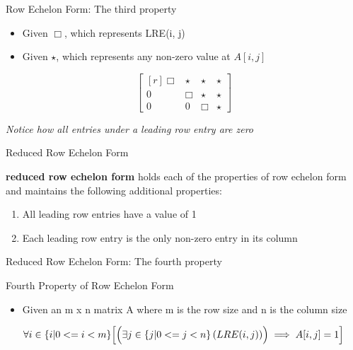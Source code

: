 \documentclass{beamer}
\begin{document}
\begin{frame}{Row Echelon Form: The third property}
  \begin{example}
    \begin{itemize}
      \item Given $\Box$, which represents LRE(i, j)
      \item Given $\star$, which represents any non-zero value at $A[i, j]$
    \end{itemize}
    \begin{equation}
      \begin{bmatrix*}[r]
        \Box & \star & \star & \star \\
        0 & \Box & \star & \star \\
        0 & 0 & \Box & \star 
      \end{bmatrix*}
    \end{equation}

    \textit{Notice how all entries under a leading row entry are zero}
  \end{example}
\end{frame}

\begin{frame}{Reduced Row Echelon Form}
  \begin{definition}
    \textbf{reduced row echelon form} holds each of the properties of row echelon form and maintains
    the following additional properties:
    \begin{enumerate}
      \item All leading row entries have a value of 1
      \item Each leading row entry is the only non-zero entry in its column 
    \end{enumerate}
  \end{definition}
\end{frame}

\begin{frame}{Reduced Row Echelon Form: The fourth property}
  \begin{block}{Fourth Property of Row Echelon Form}
    \begin{itemize}
    \item Given an m x n matrix A where m is the row size and n is the column size
    \end{itemize}
    \begin{equation}
      \begin{split}
        &\forall i \in \{i | 0 <= i < m \} \Bigl[ \Bigl( \exists j \in \{j | 0 <= j < n \} \left( LRE(i, j) \right)  \Bigr) \implies A[i, j] = 1 \Bigr] \\
      \end{split}
    \end{equation}
  \end{block}
\end{frame}
\end{document}
